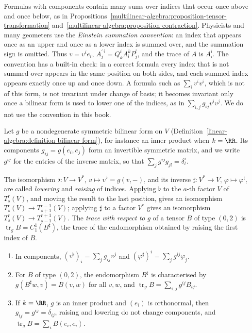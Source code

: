 \begin{remark}\label{multilinear-algebra:remark-einstein-convention}
Formulas with components contain many sums over indices that occur once above and once below, as in Propositions~\ref{multilinear-algebra:proposition-tensor-transformation}
and~\ref{multilinear-algebra:proposition-contraction}. Physicists and many geometers use the \emph{Einstein summation convention}: an index that appears once as an upper and once as a lower index is
summed over, and the summation sign is omitted. Thus $v = v^ie_i$, $A^{\prime\,i}_j = Q^i_kA^k_lP^l_j$, and the trace of $A$ is $A^i_i$. The convention has a built-in check: in a correct formula
every index that is not summed over appears in the same position on both sides, and each summed index appears exactly once up and once down. A formula such as $\sum_iv^iv^i$, which is not of this
form, is not invariant under change of basis; it becomes invariant only once a bilinear form is used to lower one of the indices, as in $\sum_{i,j}g_{ij}v^iv^j$. We do not use the convention in this book.
\end{remark}

Let $g$ be a nondegenerate symmetric bilinear form on $V$ (Definition~\ref{linear-algebra:definition-bilinear-form}), for instance an inner product when $k = \RR$. Its components
$g_{ij} = g(e_i, e_j)$ form an invertible symmetric matrix, and we write $g^{ij}$ for the entries of the inverse matrix, so that $\sum_jg^{ij}g_{jl} = \delta^i_l$.

\begin{definition}\label{multilinear-algebra:definition-raising-lowering}
The isomorphism $\flat \colon V \to V^*$, $v \mapsto v^\flat = g(v, -)$, and its inverse $\sharp \colon V^* \to V$, $\varphi \mapsto \varphi^\sharp$, are called \emph{lowering} and \emph{raising}
of indices. Applying $\flat$ to the $a$-th factor $V$ of $T^r_s(V)$, and moving the result to the last position, gives an isomorphism $T^r_s(V) \to T^{r-1}_{s+1}(V)$; applying $\sharp$ to a factor
$V^*$ gives an isomorphism $T^r_s(V) \to T^{r+1}_{s-1}(V)$. The \emph{trace with respect to $g$} of a tensor $B$ of type $(0,2)$ is
$\operatorname{tr}_gB = C^1_1(B^\sharp)$, the trace of the endomorphism obtained by raising the first index of $B$.
\end{definition}

\begin{proposition}\label{multilinear-algebra:proposition-raising-lowering}
\begin{enumerate}
\item In components, $(v^\flat)_i = \sum_jg_{ij}v^j$ and $(\varphi^\sharp)^i = \sum_jg^{ij}\varphi_j$.
\item For $B$ of type $(0,2)$, the endomorphism $B^\sharp$ is characterised by $g(B^\sharp w, v) = B(v, w)$ for all $v, w$, and $\operatorname{tr}_gB = \sum_{i,j}g^{ij}B_{ij}$.
\item If $k = \RR$, $g$ is an inner product and $(e_i)$ is orthonormal, then $g_{ij} = g^{ij} = \delta_{ij}$, raising and lowering do not change components, and
$\operatorname{tr}_gB = \sum_iB(e_i, e_i)$.
\end{enumerate}
\end{proposition}


